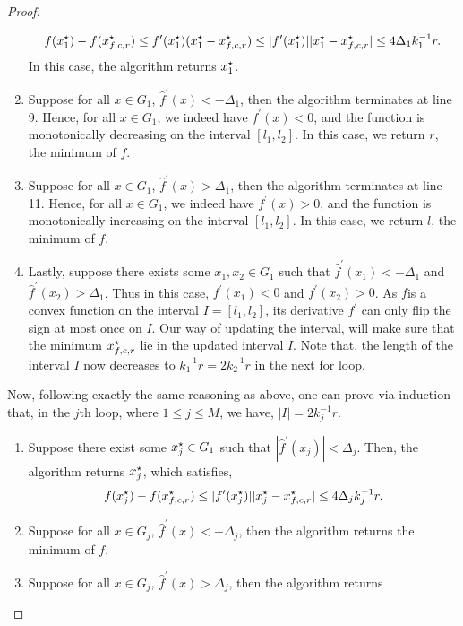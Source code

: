 \begin{proof}
\begin{enumerate}
	\begin{equation*}
	f(x_1^\star) - f(x_{f, c, r}^\star) \leq f^\prime(x_1^\star) (x_1^\star - x_{f, c, r}^\star) 
		\leq |f^\prime(x_1^\star)| |x_1^\star - x_{f, c, r}^\star|\leq  4\Delta_1 k_1^{-1}r.
	\end{equation*}
	In this case, the algorithm returns $x_1^\star$. 
\item Suppose for all $x\in G_1$, $\hat{f}^\prime(x) < -\Delta_1$, then the algorithm 
	terminates at line 9. Hence, for all $x\in G_1$, we indeed have $f^\prime(x) < 0$, 
	and the function is monotonically decreasing on the interval $[l_1, l_2]$. In this case, 
	we return $r$, the minimum of $f$. 
\item Suppose for all $x\in G_1$, $\hat{f}^\prime(x) > \Delta_1$, then the algorithm 
	terminates at line 11. Hence, for all $x\in G_1$, we indeed have $f^\prime(x) > 0$, 
	and the function is monotonically increasing on the interval $[l_1, l_2]$. In this case, 
	we return $l$, the minimum of $f$. 
\item Lastly, suppose there exists some $x_1, x_2 \in G_1$ such that 
	$\hat{f}^\prime(x_1) < -\Delta_1$ and $\hat{f}^\prime(x_2) > \Delta_1$.
	Thus in this case, $f^\prime(x_1) < 0$ and $f^\prime(x_2) > 0$.
	 As $f$is a convex function on the interval $I = [l_1, l_2]$, its derivative $f^\prime$ 
	 can only flip the sign at most once on $I$. Our way of updating the interval, 
	 will make sure that the minimum $x_{f, c, r}^\star$ lie in the updated
	 interval $I$. Note that, the length of the interval $I$ now decreases to 
	 $k_1^{-1}r = 2k_2^{-1}r$ in the next for loop.
\end{enumerate}
Now, following exactly the same reasoning as above, one can prove via induction that, 
in the $j$th loop, where $1\leq j\leq M$, we have, $|I| = 2 k_j^{-1}r$.
\begin{enumerate}
\item Suppose there exist some $x_j^\star \in G_1$ such that $|\hat{f}^\prime(x_j)| < \Delta_j$.
	Then, the algorithm returns $x_j^\star$, which satisfies, 
	\begin{equation*}
	f(x_j^\star) - f(x_{f, c, r}^\star) \leq 
		 |f^\prime(x_j^\star)| |x_j^\star - x_{f, c, r}^\star|\leq  4\Delta_j k_{j}^{-1}r.
	\end{equation*}
\item Suppose for all $x\in G_j$, $\hat{f}^\prime(x) < -\Delta_j$, then the algorithm returns 
	the minimum of $f$.
\item Suppose for all $x\in G_j$, $\hat{f}^\prime(x) >  \Delta_j$, then the algorithm returns 

\end{enumerate}
\end{proof}
